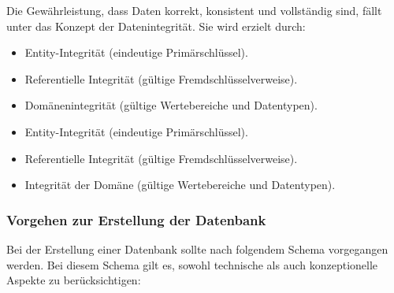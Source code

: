 Die Gewährleistung, dass Daten korrekt, konsistent und vollständig sind,
fällt unter das Konzept der Datenintegrität.
Sie wird erzielt durch: \cite*[38-41]{Gadatsch2019}

\begin{itemize}
\item
Entity-Integrität (eindeutige Primärschlüssel).
\item
Referentielle Integrität (gültige Fremdschlüsselverweise).

\item Domänenintegrität (gültige Wertebereiche und Datentypen).
\item Entity-Integrität (eindeutige Primärschlüssel).
\item Referentielle Integrität (gültige Fremdschlüsselverweise).
\item Integrität der Domäne (gültige Wertebereiche und Datentypen).

\end{itemize}

\textit{%
}\subsubsection{Vorgehen zur Erstellung der Datenbank}
\textit{%
}Bei der Erstellung einer Datenbank sollte nach folgendem Schema vorgegangen werden.
Bei diesem Schema gilt es, sowohl technische als auch konzeptionelle Aspekte zu berücksichtigen: \cite*[9-11]{Herrmann2018}

